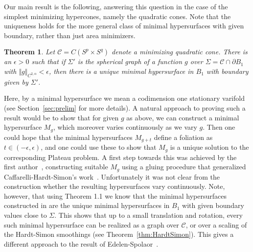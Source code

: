 \documentclass[12pt, reqno ]{amsart}
\newtheorem{theorem}{Theorem}[section]
\numberwithin{equation}{section}
\begin{document}
Our main result is the following, answering this question in the case
of the simplest minimizing hypercones, namely the quadratic
cones. Note that the uniqueness holds for the more general class of minimal hypersurfaces with given boundary, rather than just area minimizers.  
\begin{theorem}\label{thm:main}
  Let $\mathcal{C} = C(S^p\times S^q)$ denote a minimizing quadratic
  cone. There is an $\epsilon > 0$ such that if $\Sigma'$ is the
  spherical graph of a function $g$ over $\Sigma = \mathcal{C}\cap
  \partial B_1$ with $\Vert g\Vert_{C^{2,\alpha}}  <\epsilon$, then
  there is a unique minimal hypersurface in $B_1$ with boundary
  given by $\Sigma'$. 
\end{theorem}

Here, by a minimal hypersurface we mean a codimension one stationary varifold (see Section~\ref{sec:prelim} for more details).
A natural approach to proving such a result would be to show that for
given $g$ as above, we can construct a minimal hypersurface $M_g$, which
moreover varies continuously as we vary $g$. Then one could hope that
the minimal hypersurfaces $M_{g + t}$ define a foliation as $t\in
(-\epsilon, \epsilon)$, and one could use these to show that $M_g$ is
a unique solution to the corresponding Plateau problem. A first step
towards this was achieved by the first author~\cite{nandakumaran2024minimalsurfacesnearhardtsimon},
constructing suitable $M_g$ using a gluing procedure that generalized
Caffarelli-Hardt-Simon's work~\cite{CHS}. Unfortunately it was not
clear from the construction whether the resulting hypersurfaces vary
continuously. Note, however, that using Theorem 1.1 we know that the minimal hypersurfaces constructed in \cite{nandakumaran2024minimalsurfacesnearhardtsimon} are the unique minimal hypersurfaces in $B_1$ with given boundary values close to $\Sigma$. This shows that up to a small translation and rotation, every such minimal hypersurface can be realized as a graph over $\mathcal{C}$, or over a scaling of the Hardt-Simon smoothings (see Theorem~\ref{thm:HardtSimon}). This gives a different approach to the result of Edelen-Spolaor~\cite{Nick}. 
\end{document}
